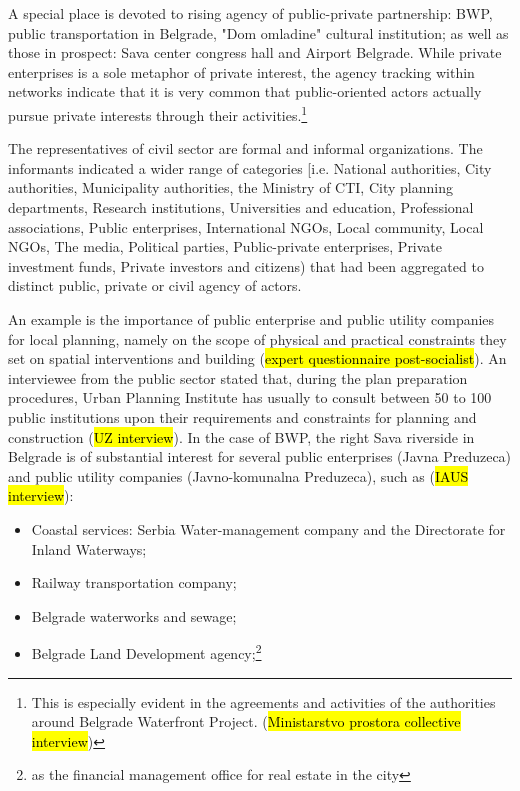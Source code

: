\documentclass[11pt]{report}
\begin{document}
A special place is devoted to rising agency of public-private partnership: BWP, public transportation in Belgrade, "Dom omladine" cultural institution; as well as those in prospect: Sava center congress hall and Airport Belgrade. 
While private enterprises is a sole metaphor of private interest, the agency tracking within networks indicate that it is very common that public-oriented actors actually pursue private interests through their activities.\footnote{This is especially evident in the agreements and activities of the authorities around Belgrade Waterfront Project. (\hl{Ministarstvo prostora collective interview})}

The representatives of civil sector are formal and informal organizations. 
The informants indicated a wider range of categories [i.e. National authorities, City authorities, Municipality authorities, the Ministry of CTI, City planning departments, Research institutions, Universities and education, Professional associations, Public enterprises, International NGOs, Local community, Local NGOs, The media, Political parties, Public-private enterprises, Private investment funds, Private investors and citizens) that had been aggregated to distinct public, private or civil agency of actors.

An example is the importance of public enterprise and public utility companies for local planning, namely on the scope of physical and practical constraints they set on spatial interventions and building (\hl{expert questionnaire post-socialist}).
An interviewee from the public sector stated that, during the plan preparation procedures, Urban Planning Institute has usually to consult between 50 to 100 public institutions upon their requirements and constraints for planning and construction (\hl{UZ interview}).
In the case of BWP, the right Sava riverside in Belgrade is of substantial interest for several public enterprises (Javna Preduzeca) and public utility companies (Javno-komunalna Preduzeca), such as (\hl{IAUS interview}): 

\begin{itemize}
\item Coastal services: Serbia Water-management company and the Directorate for Inland Waterways;
\item Railway transportation company;
\item Belgrade waterworks and sewage;
\item Belgrade Land Development agency;\footnote{as the financial management office for real estate in the city}
\end{itemize}
\end{document}
